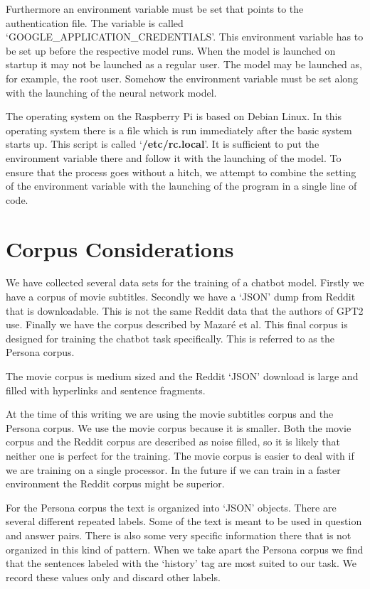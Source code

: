 Furthermore an environment variable must be set that points to the authentication file. The variable is called `GOOGLE\_APPLICATION\_CREDENTIALS'. This environment variable has to be set up before the respective model runs. When the model is launched on startup it may not be launched as a regular user. The model may be launched as, for example, the root user. Somehow the environment variable must be set along with the launching of the neural network model.

The operating system on the Raspberry Pi is based on Debian Linux. In this operating system there is a file which is run immediately after the basic system starts up. This script is called `\textbf{/etc/rc.local}'. It is sufficient to put the environment variable there and follow it with the launching of the model. To ensure that the process goes without a hitch, we attempt to combine the setting of the environment variable with the launching of the program in a single line of code.

\section{Corpus Considerations}

We have collected several data sets for the training of a chatbot model. Firstly we have a corpus of movie subtitles. Secondly we have a `JSON' dump from Reddit that is downloadable.  This is not the same Reddit data that the authors of GPT2 use. Finally we have the corpus described by Mazar{\'{e}} et al\cite{DBLP:journals/corr/abs-1809-01984}. This final corpus is designed for training the chatbot task specifically. This is referred to as the Persona corpus.

The movie corpus is medium sized and the Reddit `JSON' download is large and filled with hyperlinks and sentence fragments. 

At the time of this writing we are using the movie subtitles corpus and the Persona corpus. We use the movie corpus because it is smaller. Both the movie corpus and the Reddit corpus are described as noise filled, so it is likely that neither one is perfect for the training. The movie corpus is easier to deal with if we are training on a single processor. In the future if we can train in a faster environment the Reddit corpus might be superior.

For the Persona corpus the text is organized into `JSON' objects. There are several different repeated labels. Some of the text is meant to be used in question and answer pairs. There is also some very specific information there that is not organized in this kind of pattern. When we take apart the Persona corpus we find that the sentences labeled with the `history' tag are most suited to our task. We record these values only and discard other labels.

